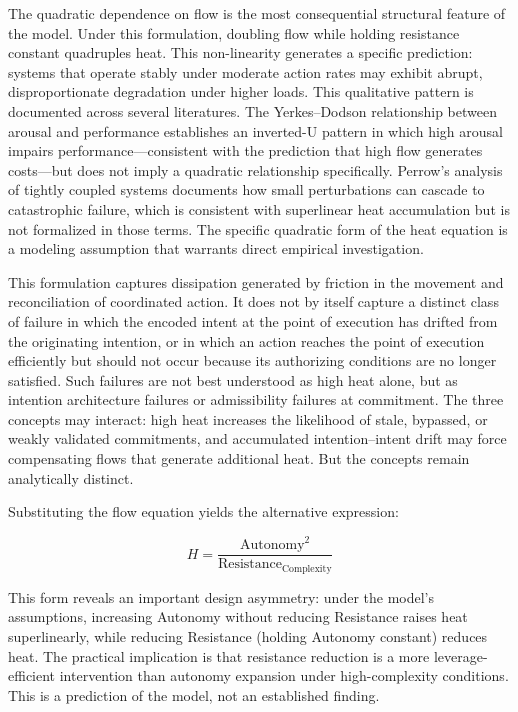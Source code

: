\documentclass[12pt]{article}
\begin{document}
The quadratic dependence on flow is the most consequential structural
feature of the model. Under this formulation, doubling flow while holding
resistance constant quadruples heat. This non-linearity generates
a specific prediction: systems that operate stably under moderate action
rates may exhibit abrupt, disproportionate degradation under higher loads.
This qualitative pattern is documented across several literatures.
The Yerkes--Dodson relationship between arousal and performance
\citep{yerkes1908relation} establishes an inverted-U pattern in which
high arousal impairs performance---consistent with the prediction that high
flow generates costs---but does not imply a quadratic relationship specifically.
Perrow's analysis of tightly coupled systems \citep{perrow1984normal}
documents how small perturbations can cascade to catastrophic failure,
which is consistent with superlinear heat accumulation but is not formalized
in those terms. The specific quadratic form of the heat equation is a modeling
assumption that warrants direct empirical investigation.

This formulation captures dissipation generated by friction in the movement
and reconciliation of coordinated action. It does not by itself capture a
distinct class of failure in which the encoded intent at the point of execution
has drifted from the originating intention, or in which an action reaches
the point of execution efficiently but should not occur because its authorizing
conditions are no longer satisfied. Such failures are not best understood as
high heat alone, but as intention architecture failures or admissibility
failures at commitment. The three concepts may interact: high heat increases
the likelihood of stale, bypassed, or weakly validated commitments, and
accumulated intention--intent drift may force compensating flows that generate
additional heat. But the concepts remain analytically distinct.

Substituting the flow equation yields the alternative expression:

\[
H = \frac{\text{Autonomy}^2}{\text{Resistance}_{\text{Complexity}}}
\]

This form reveals an important design asymmetry: under the model's
assumptions, increasing Autonomy without reducing Resistance raises heat
superlinearly, while reducing Resistance (holding Autonomy constant) reduces
heat. The practical implication is that resistance reduction is a more
leverage-efficient intervention than autonomy expansion under high-complexity
conditions. This is a prediction of the model, not an established finding.
\end{document}
